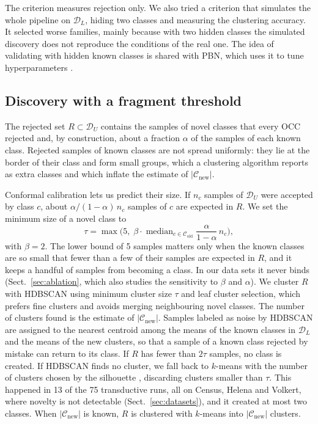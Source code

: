 \documentclass[pdflatex,sn-basic]{sn-jnl}
\newcommand{\DL}{\mathcal{D}_L}
\newcommand{\DU}{\mathcal{D}_U}
\newcommand{\Cold}{\mathcal{C}_{\mathrm{old}}}
\newcommand{\Cnew}{\mathcal{C}_{\mathrm{new}}}
\begin{document}
The criterion measures rejection only. We also tried a criterion that simulates the whole pipeline on $\DL$, hiding two classes and measuring the clustering accuracy. It selected worse families, mainly because with two hidden classes the simulated discovery does not reproduce the conditions of the real one. The idea of validating with hidden known classes is shared with PBN, which uses it to tune hyperparameters \citep{troisemaine2024pbn}.

\subsection{Discovery with a fragment threshold}\label{sec:discovery}

The rejected set $R \subset \DU$ contains the samples of novel classes that every OCC rejected and, by construction, about a fraction $\alpha$ of the samples of each known class. Rejected samples of known classes are not spread uniformly: they lie at the border of their class and form small groups, which a clustering algorithm reports as extra classes and which inflate the estimate of $|\Cnew|$.

Conformal calibration lets us predict their size. If $n_c$ samples of $\DU$ were accepted by class $c$, about $\alpha/(1-\alpha)\, n_c$ samples of $c$ are expected in $R$. We set the minimum size of a novel class to
\begin{equation}
\tau = \max\Big(5,\; \beta \cdot \operatorname{median}_{c \in \Cold} \frac{\alpha}{1-\alpha}\, n_c \Big),
\label{eq:tau}
\end{equation}
with $\beta = 2$. The lower bound of 5 samples matters only when the known classes are so small that fewer than a few of their samples are expected in $R$, and it keeps a handful of samples from becoming a class. In our data sets it never binds (Sect.~\ref{sec:ablation}, which also studies the sensitivity to $\beta$ and $\alpha$). We cluster $R$ with HDBSCAN \citep{campello2013hdbscan} using minimum cluster size $\tau$ and leaf cluster selection, which prefers fine clusters and avoids merging neighbouring novel classes. The number of clusters found is the estimate of $|\Cnew|$. Samples labeled as noise by HDBSCAN are assigned to the nearest centroid among the means of the known classes in $\DL$ and the means of the new clusters, so that a sample of a known class rejected by mistake can return to its class. If $R$ has fewer than $2\tau$ samples, no class is created. If HDBSCAN finds no cluster, we fall back to $k$-means with the number of clusters chosen by the silhouette \citep{rousseeuw1987silhouette}, discarding clusters smaller than $\tau$. This happened in 13 of the 75 transductive runs, all on Census, Helena and Volkert, where novelty is not detectable (Sect.~\ref{sec:datasets}), and it created at most two classes. When $|\Cnew|$ is known, $R$ is clustered with $k$-means into $|\Cnew|$ clusters.
\end{document}
